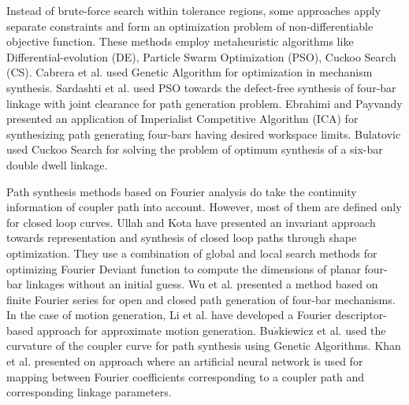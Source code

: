 \documentclass[twocolumn,10pt]{asme2ej}
\begin{document}

Instead of brute-force search within tolerance regions, some approaches apply separate constraints and form an optimization problem of non-differentiable objective function.
These methods employ metaheuristic algorithms like Differential-evolution (DE), Particle Swarm Optimization (PSO), Cuckoo Search (CS). Cabrera et al.\cite{Cabrera2002} used Genetic Algorithm for optimization in mechanism synthesis. Sardashti et al.\cite{sardashti2013} used PSO towards the defect-free synthesis of four-bar linkage with joint clearance for path generation problem. Ebrahimi and Payvandy\cite{Ebrahimi2015} presented an application of Imperialist Competitive Algorithm (ICA) for synthesizing path generating four-bars having desired workspace limits. Bulatovic\cite{Bulatovic2013} used Cuckoo Search for solving the problem of optimum synthesis of a six-bar double dwell linkage. 

Path synthesis methods based on Fourier analysis do take the continuity information of coupler path into account.
However, most of them are defined only for closed loop curves.
Ullah and Kota\cite{ullah1997} have presented an invariant approach towards representation and synthesis of closed loop paths through shape optimization.
They use a combination of global and local search methods for optimizing Fourier Deviant function to compute the dimensions of planar four-bar linkages without an initial guess.
Wu et al.\cite{wu2011} presented a method based on finite Fourier series for open and closed path generation of four-bar mechanisms.
In the case of motion generation, Li et al.\cite{li2016} have developed a Fourier descriptor-based approach for approximate motion generation.
Bu$\acute{s}$kiewicz et al.\cite{Buskiewicz2009} used the curvature of the coupler curve for path synthesis using Genetic Algorithms.
Khan et al.\cite{khan2015} presented on approach where an artificial neural network is used for mapping between Fourier coefficients corresponding to a coupler path and corresponding linkage parameters.
\end{document}

